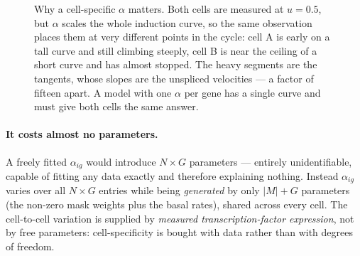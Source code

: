 \documentclass[11pt,a4paper]{article}
\newcommand{\uns}{u}
\theoremstyle{definition}
\begin{document}
\begin{figure}[htbp]
\centering
{}
\caption{Why a cell-specific $\alpha$ matters. Both cells are measured at
$\uns = 0.5$, but $\alpha$ scales the whole induction curve, so the same
observation places them at very different points in the cycle: cell A is early
on a tall curve and still climbing steeply, cell B is near the ceiling of a
short curve and has almost stopped. The heavy segments are the tangents, whose
slopes are the unspliced velocities --- a factor of fifteen apart. A model with
one $\alpha$ per gene has a single curve and must give both cells the same
answer.}
\label{fig:alpha}
\end{figure}

\paragraph{It costs almost no parameters.} A freely fitted $\alpha_{ig}$ would
introduce $N \times G$ parameters --- entirely unidentifiable, capable of
fitting any data exactly and therefore explaining nothing. Instead
$\alpha_{ig}$ varies over all $N \times G$ entries while being \emph{generated}
by only $|M| + G$ parameters (the non-zero mask weights plus the basal rates),
shared across every cell. The cell-to-cell variation is supplied by
\emph{measured transcription-factor expression}, not by free parameters:
cell-specificity is bought with data rather than with degrees of freedom.
\end{document}
